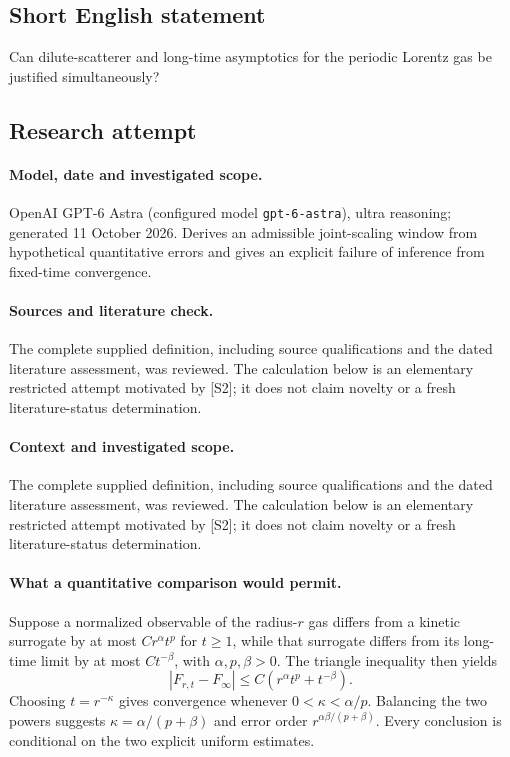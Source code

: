\documentclass[11pt]{article}
\begin{document}
\subsection{Short English statement}
Can dilute-scatterer and long-time asymptotics for the periodic Lorentz gas be justified simultaneously?
\subsection{Research attempt}
\paragraph{Model, date and investigated scope.}
OpenAI GPT-6 Astra (configured model \texttt{gpt-6-astra}), ultra reasoning; generated 11 October 2026. Derives an admissible joint-scaling window from hypothetical quantitative errors and gives an explicit failure of inference from fixed-time convergence.

\paragraph{Sources and literature check.}
The complete supplied definition, including source qualifications and the dated literature assessment, was reviewed. The calculation below is an elementary restricted attempt motivated by [S2]; it does not claim novelty or a fresh literature-status determination.

\paragraph{Context and investigated scope.} The complete supplied definition, including source qualifications and the dated literature assessment, was reviewed. The calculation below is an elementary restricted attempt motivated by [S2]; it does not claim novelty or a fresh literature-status determination.

\paragraph{What a quantitative comparison would permit.} Suppose a normalized observable of the radius-$r$ gas differs from a kinetic surrogate by at most $Cr^\alpha t^p$ for $t\geq1$, while that surrogate differs from its long-time limit by at most $Ct^{-\beta}$, with $\alpha,p,\beta>0$. The triangle inequality then yields
\[
 |F_{r,t}-F_\infty|\leq C(r^\alpha t^p+t^{-\beta}).
\]
Choosing $t=r^{-\kappa}$ gives convergence whenever $0<\kappa<\alpha/p$. Balancing the two powers suggests $\kappa=\alpha/(p+\beta)$ and error order $r^{\alpha\beta/(p+\beta)}$. Every conclusion is conditional on the two explicit uniform estimates.
\end{document}
